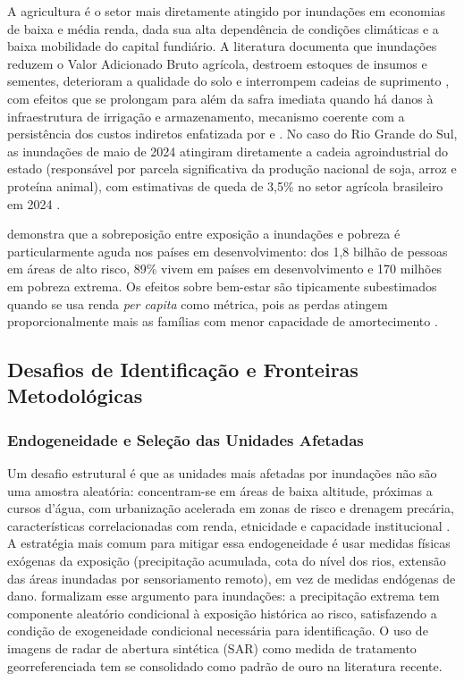 \documentclass[a4paper,12pt]{article}
\begin{document}
A agricultura é o setor mais diretamente atingido por inundações em economias de baixa e
média renda, dada sua alta dependência de condições climáticas e a baixa mobilidade do
capital fundiário.
A literatura documenta que inundações reduzem o Valor Adicionado
Bruto agrícola, destroem estoques de insumos e sementes, deterioram a qualidade do solo
e interrompem cadeias de suprimento \cite{leiter2009, bergholt2012}, com efeitos que se
prolongam para além da safra imediata quando há danos à infraestrutura de irrigação e
armazenamento, mecanismo coerente com a persistência dos custos indiretos enfatizada
por  e .
No caso do Rio Grande do Sul, as inundações de maio de 2024 atingiram diretamente a
cadeia agroindustrial do estado (responsável por parcela significativa da produção
nacional de soja, arroz e proteína animal), com estimativas de queda de 3,5\% no setor
agrícola brasileiro em 2024 \cite{ocha2024}.

 demonstra que a sobreposição entre exposição a inundações e
pobreza é particularmente aguda nos países em desenvolvimento: dos 1,8 bilhão de
pessoas em áreas de alto risco, 89\% vivem em países em desenvolvimento e 170 milhões
em pobreza extrema. Os efeitos sobre bem-estar são tipicamente subestimados quando se
usa renda \textit{per capita} como métrica, pois as perdas atingem proporcionalmente mais
as famílias com menor capacidade de amortecimento \cite{rentschler2022}.

\subsection{Desafios de Identificação e Fronteiras Metodológicas}
\label{sub:identificacao}

\subsubsection{Endogeneidade e Seleção das Unidades Afetadas}

Um desafio estrutural é que as unidades mais afetadas por inundações não são uma amostra
aleatória: concentram-se em áreas de baixa altitude, próximas a cursos d'água, com
urbanização acelerada em zonas de risco e drenagem precária, características
correlacionadas com renda, etnicidade e capacidade institucional
\cite{kahn2005death, rentschler2022}.
A estratégia mais
comum para mitigar essa endogeneidade é usar medidas físicas exógenas da exposição
(precipitação acumulada, cota do nível dos rios, extensão das áreas inundadas por
sensoriamento remoto), em vez de medidas endógenas de dano.
formalizam esse argumento para inundações: a precipitação extrema tem componente
aleatório condicional à exposição histórica ao risco, satisfazendo a condição de
exogeneidade condicional necessária para identificação. O uso de imagens de radar de
abertura sintética (SAR) como medida de tratamento georreferenciada tem se consolidado
como padrão de ouro na literatura recente.
\end{document}
